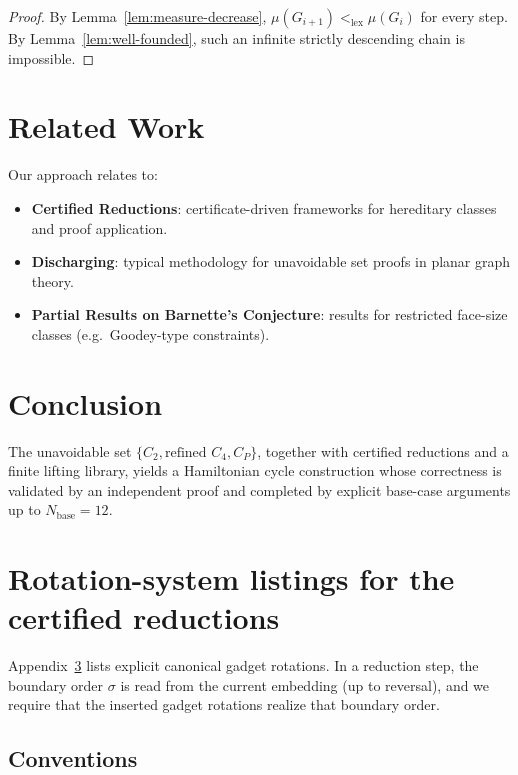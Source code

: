 \documentclass[12pt]{article}
\theoremstyle{definition}
\begin{document}
\begin{proof}
By Lemma~\ref{lem:measure-decrease}, $\mu(G_{i+1}) <_{\text{lex}} \mu(G_i)$ for every step. By Lemma~\ref{lem:well-founded}, such an infinite strictly descending chain is impossible.
\end{proof}

\section{Related Work}
\label{sec:related}

Our approach relates to:
\begin{itemize}
    \item \textbf{Certified Reductions}: certificate-driven frameworks for hereditary classes and proof application.
    \item \textbf{Discharging}: typical methodology for unavoidable set proofs in planar graph theory.
    \item \textbf{Partial Results on Barnette's Conjecture}: results for restricted face-size classes (e.g.\ Goodey-type constraints).
\end{itemize}

\section{Conclusion}
\label{sec:conclusion}

The unavoidable set $\{C_2,\text{refined }C_4,C_P\}$, together with certified reductions and a finite lifting library, yields a Hamiltonian cycle construction whose correctness is validated by an independent proof and completed by explicit base-case arguments up to $N_{\mathrm{base}}=12$.

\section{Rotation-system listings for the certified reductions}
\label{app:rotation-listings}

Appendix~\ref{app:rotation-listings} lists explicit canonical gadget rotations.
In a reduction step, the boundary order $\sigma$ is read from the current embedding (up to reversal), and we require that the inserted gadget rotations realize that boundary order.

\subsection{Conventions}
\label{app:rot-conventions}
\end{document}
